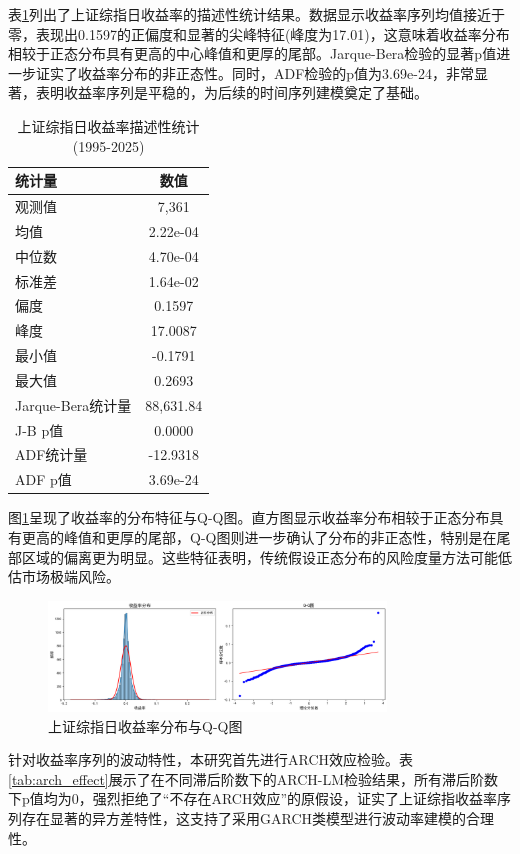 \documentclass[12pt, a4paper]{article}
\begin{document}
表\ref{tab:sse_stats}列出了上证综指日收益率的描述性统计结果。数据显示收益率序列均值接近于零，表现出0.1597的正偏度和显著的尖峰特征(峰度为17.01)，这意味着收益率分布相较于正态分布具有更高的中心峰值和更厚的尾部。Jarque-Bera检验的显著p值进一步证实了收益率分布的非正态性。同时，ADF检验的p值为3.69e-24，非常显著，表明收益率序列是平稳的，为后续的时间序列建模奠定了基础。

\begin{table}[htbp]
\centering
\caption{上证综指日收益率描述性统计(1995-2025)}
\label{tab:sse_stats}
\begin{tabular}{lc}
\toprule
统计量 & 数值 \\
\midrule
观测值 & 7,361 \\
均值 & 2.22e-04 \\
中位数 & 4.70e-04 \\
标准差 & 1.64e-02 \\
偏度 & 0.1597 \\
峰度 & 17.0087 \\
最小值 & -0.1791 \\
最大值 & 0.2693 \\
Jarque-Bera统计量 & 88,631.84 \\
J-B p值 & 0.0000 \\
ADF统计量 & -12.9318 \\
ADF p值 & 3.69e-24 \\
\bottomrule
\end{tabular}
\end{table}

图\ref{fig:sse_returns_dist}呈现了收益率的分布特征与Q-Q图。直方图显示收益率分布相较于正态分布具有更高的峰值和更厚的尾部，Q-Q图则进一步确认了分布的非正态性，特别是在尾部区域的偏离更为明显。这些特征表明，传统假设正态分布的风险度量方法可能低估市场极端风险。

\begin{figure}[htbp]
\centering
\includegraphics[width=0.8\textwidth]{./img/收益率分布.png}
\caption{上证综指日收益率分布与Q-Q图}
\label{fig:sse_returns_dist}
\end{figure}

针对收益率序列的波动特性，本研究首先进行ARCH效应检验。表\ref{tab:arch_effect}展示了在不同滞后阶数下的ARCH-LM检验结果，所有滞后阶数下p值均为0，强烈拒绝了“不存在ARCH效应”的原假设，证实了上证综指收益率序列存在显著的异方差特性，这支持了采用GARCH类模型进行波动率建模的合理性。
\end{document}
